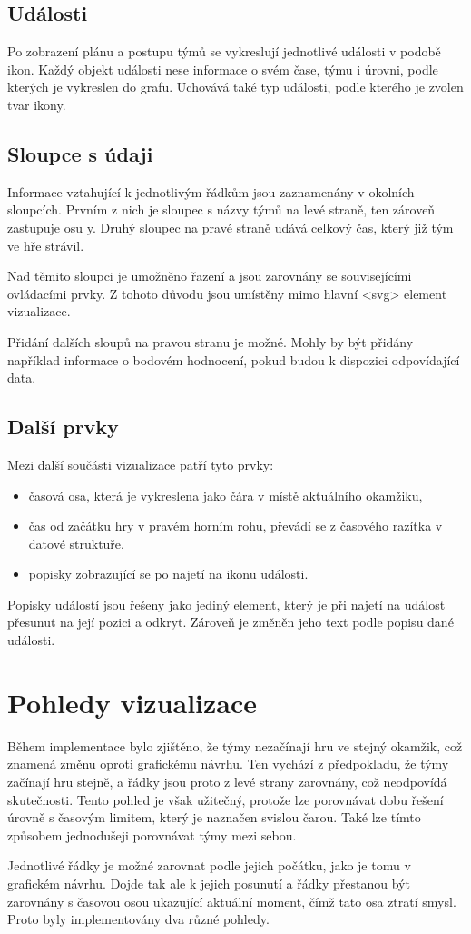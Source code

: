 \documentclass[
  digital, %
  oneside, %
  table,   %
  nolof,     %
  nolot,     %
]{fithesis3}
\begin{document}
\subsection{Události}
Po zobrazení plánu a postupu týmů se vykreslují jednotlivé události v podobě ikon. Každý objekt události nese informace o svém čase, týmu i úrovni, podle kterých je vykreslen do grafu. Uchovává také typ události, podle kterého je zvolen tvar ikony.
\subsection{Sloupce s údaji}
Informace vztahující k jednotlivým řádkům jsou zaznamenány v okolních sloupcích. Prvním z nich je sloupec s názvy týmů na levé straně, ten zároveň zastupuje osu y. Druhý sloupec na pravé straně udává celkový čas, který již tým ve hře strávil.\par
Nad těmito sloupci je umožněno řazení a jsou zarovnány se souvisejícími ovládacími prvky. Z tohoto důvodu jsou umístěny mimo hlavní <svg> element vizualizace.\par
Přidání dalších sloupů na pravou stranu je možné. Mohly by být přidány například informace o bodovém hodnocení, pokud budou k dispozici odpovídající data.
\subsection{Další prvky}
Mezi další součásti vizualizace patří tyto prvky:
\begin{itemize}
  \item časová osa, která je vykreslena jako čára v místě aktuálního okamžiku,
  \item čas od začátku hry v pravém horním rohu, převádí se z časového razítka v datové struktuře,
  \item popisky zobrazující se po najetí na ikonu události.
\end{itemize}
Popisky událostí jsou řešeny jako jediný element, který je při najetí na událost přesunut na její pozici a odkryt. Zároveň je změněn jeho text podle popisu dané události.

\section{Pohledy vizualizace}
Během implementace bylo zjištěno, že týmy nezačínají hru ve stejný okamžik, což znamená změnu oproti grafickému návrhu. Ten vychází z předpokladu, že týmy začínají hru stejně, a řádky jsou proto z levé strany zarovnány, což neodpovídá skutečnosti. Tento pohled je však užitečný, protože lze porovnávat dobu řešení úrovně s časovým limitem, který je naznačen svislou čarou. Také lze tímto způsobem jednodušeji porovnávat týmy mezi sebou.\par
Jednotlivé řádky je možné zarovnat podle jejich počátku, jako je tomu v grafickém návrhu. Dojde tak ale k jejich posunutí a řádky přestanou být zarovnány s časovou osou ukazující aktuální moment, čímž tato osa ztratí smysl. Proto byly implementovány dva různé pohledy.
\end{document}

